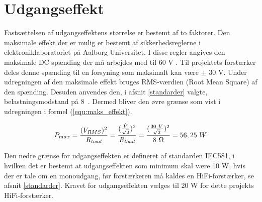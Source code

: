 \section{Udgangseffekt}
\label{valg_udgangseffekt}
Fastsættelsen af udgangseffektens størrelse er bestemt af to faktorer. Den maksimale effekt der er mulig er bestemt af sikkerhedsreglerne i elektroniklaboratoriet på Aalborg Universitet. I disse regler angives den maksimale DC spænding der må arbejdes med til 60 V \cite{elregler-b1101}. 
Til projektets forstærker deles denne spænding til en forsyning som maksimalt kan være $\pm$ 30 V. Under udregningen af den maksimale effekt bruges RMS-værdien (Root Mean Square) af den spænding. Desuden anvendes den, i afsnit \ref{standarder} valgte, belastningsmodstand på 8~\ohm. Dermed bliver den øvre grænse som vist i udregningen i formel (\ref{equ:maks_effekt}).

\begin{equation}
\label{equ:maks_effekt}
P_{max} = \frac{(V_{RMS})^2}{R_{load}}= \frac{(\frac{\hat{V}}{\sqrt{2}})^2}{R_{load}} = \frac{(\frac{30~V}{\sqrt{2}})^2}{8~\ohm} = 56,25~W
\end{equation}

Den nedre grænse for udgangseffekten er defineret af standarden IEC581, i hvilken det er bestemt at udgangseffekten som minimum skal være 10 W, hvis der er tale om en monoudgang, før forstærkeren må kaldes en HiFi-forstærker, se afsnit \ref{standarder}. Kravet for udgangseffekten vælges til 20 W for dette projekts HiFi-forstærker.
